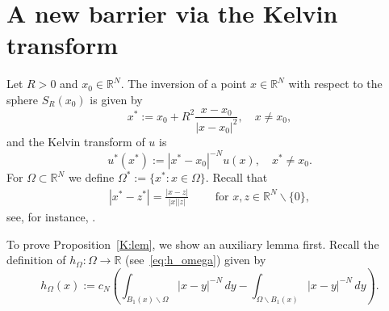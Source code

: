 \documentclass[11pt]{article}
\newcommand{\R}{\mathbb{R}}
\numberwithin{equation}{section}
\begin{document}
\section{A new barrier via the Kelvin transform} \label{sec:kelvin}

Let $R>0$ and $x_0\in \R^N$. The inversion of a point $x\in \R^N$ with respect to the sphere $S_{R}(x_0)$ is given by
\begin{equation} \label{eq:inversion_sphere}
    x^* := x_0 + R^2\frac{x-x_0}{|x-x_0|^2}, \quad x \neq x_0,
\end{equation}
and the Kelvin transform of $u$ is
\begin{equation} \label{eq:kelvin_transform}
    u^*(x^*) := |x^*-x_0|^{-N} u(x), \quad x^* \neq x_0.
\end{equation}
For $\Omega \subset \R^N$ we define $\Omega^* := \{ x^*: x\in \Omega \}$.  Recall that
\begin{align}\label{Kelvin:prop}
    |x^*-z^*|=\frac{|x - z|}{|x||z|}\qquad \text{ for }x,z\in\R^N\backslash\{0\},
\end{align}
see, for instance, \cite[Proposition A.3]{B16}.  

To prove Proposition~\ref{K:lem}, we show an auxiliary lemma first. Recall the definition of $h_\Omega:\Omega\to\R$ (see~\eqref{eq:h_omega}) given by
\begin{equation*}
h_\Omega(x):=c_N\left(\int_{B_1(x)\backslash \Omega}|x-y|^{-N}\, dy-\int_{ \Omega\backslash B_1(x)}|x-y|^{-N}\, dy\right).
\end{equation*}
\end{document}
